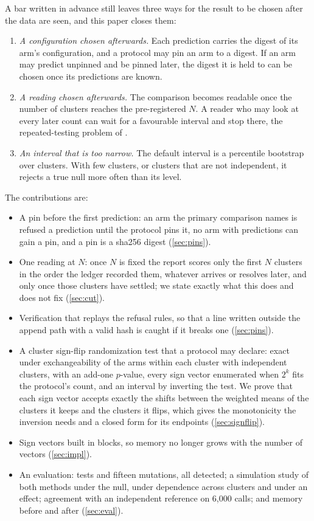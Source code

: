 \documentclass[11pt]{article}
\theoremstyle{plain}
\theoremstyle{definition}
\theoremstyle{remark}
\begin{document}
A bar written in advance still leaves three ways for the result to be chosen after the data are
seen, and this paper closes them:
\begin{enumerate}
\item \emph{A configuration chosen afterwards.} Each prediction carries the digest of its arm's
  configuration, and a protocol may pin an arm to a digest. If an arm may predict unpinned and be
  pinned later, the digest it is held to can be chosen once its predictions are known.
\item \emph{A reading chosen afterwards.} The comparison becomes readable once the number of
  clusters reaches the pre-registered $N$. A reader who may look at every later count can wait
  for a favourable interval and stop there, the repeated-testing problem of
  \citet{armitage1969}.
\item \emph{An interval that is too narrow.} The default interval is a percentile bootstrap over
  clusters. With few clusters, or clusters that are not independent, it rejects a true null more
  often than its level.
\end{enumerate}

The contributions are:
\begin{itemize}
\item A pin before the first prediction: an arm the primary comparison names is refused a
  prediction until the protocol pins it, no arm with predictions can gain a pin, and a pin is a
  sha256 digest (\cref{sec:pins}).
\item One reading at $N$: once $N$ is fixed the report scores only the first $N$ clusters in the
  order the ledger recorded them, whatever arrives or resolves later, and only once those clusters
  have settled; we state exactly what this does and does not fix (\cref{sec:cut}).
\item Verification that replays the refusal rules, so that a line written outside the append path
  with a valid hash is caught if it breaks one (\cref{sec:pins}).
\item A cluster sign-flip randomization test that a protocol may declare: exact under
  exchangeability of the arms within each cluster with independent clusters, with an add-one
  $p$-value, every sign vector enumerated when $2^k$ fits the protocol's count, and an interval by
  inverting the test. We prove that each sign vector accepts exactly the shifts between the
  weighted means of the clusters it keeps and the clusters it flips, which gives the monotonicity
  the inversion needs and a closed form for its endpoints (\cref{sec:signflip}).
\item Sign vectors built in blocks, so memory no longer grows with the number of vectors
  (\cref{sec:impl}).
\item An evaluation: tests and fifteen mutations, all detected; a simulation study of both
  methods under the null, under dependence across clusters and under an effect; agreement with an
  independent reference on 6{,}000 calls; and memory before and after (\cref{sec:eval}).
\end{itemize}
\end{document}
